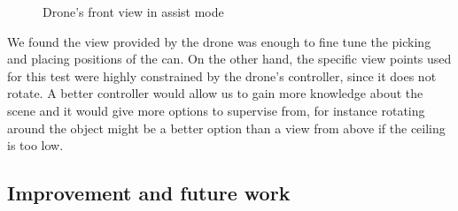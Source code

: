 \documentclass[11pt,a4paper]{article}
\begin{document}
\begin{figure}[ht!]%
	\centering
    \qquad  
    \qquad  
    \qquad  
    \caption{Drone's front view in assist mode}
    \label{fig:assistmode2}
\end{figure}


We found the view provided by the drone was enough to fine tune the picking and placing positions of the can. On the other hand, the specific view points used for this test were highly constrained by the drone's controller, since it does not rotate. A better controller would allow us to gain more knowledge about the scene and it would give more options to supervise from, for instance rotating around the object might be a better option than a view from above if the ceiling is too low. 



\subsection{Improvement and future work}
\end{document}
